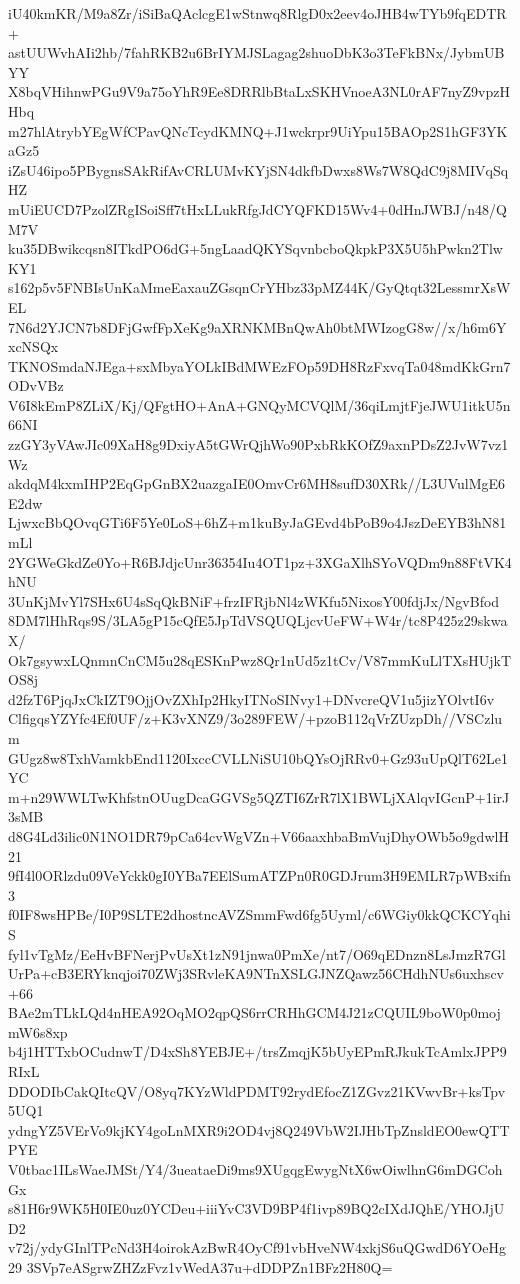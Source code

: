 iU40kmKR/M9a8Zr/iSiBaQAclcgE1wStnwq8RlgD0x2eev4oJHB4wTYb9fqEDTR+
astUUWvhAIi2hb/7fahRKB2u6BrIYMJSLagag2shuoDbK3o3TeFkBNx/JybmUBYY
X8bqVHihnwPGu9V9a75oYhR9Ee8DRRlbBtaLxSKHVnoeA3NL0rAF7nyZ9vpzHHbq
m27hlAtrybYEgWfCPavQNcTcydKMNQ+J1wckrpr9UiYpu15BAOp2S1hGF3YKaGz5
iZsU46ipo5PBygnsSAkRifAvCRLUMvKYjSN4dkfbDwxs8Ws7W8QdC9j8MIVqSqHZ
mUiEUCD7PzolZRgISoiSff7tHxLLukRfgJdCYQFKD15Wv4+0dHnJWBJ/n48/QM7V
ku35DBwikcqsn8ITkdPO6dG+5ngLaadQKYSqvnbcboQkpkP3X5U5hPwkn2TlwKY1
s162p5v5FNBIsUnKaMmeEaxauZGsqnCrYHbz33pMZ44K/GyQtqt32LessmrXsWEL
7N6d2YJCN7b8DFjGwfFpXeKg9aXRNKMBnQwAh0btMWIzogG8w//x/h6m6YxcNSQx
TKNOSmdaNJEga+sxMbyaYOLkIBdMWEzFOp59DH8RzFxvqTa048mdKkGrn7ODvVBz
V6I8kEmP8ZLiX/Kj/QFgtHO+AnA+GNQyMCVQlM/36qiLmjtFjeJWU1itkU5n66NI
zzGY3yVAwJIc09XaH8g9DxiyA5tGWrQjhWo90PxbRkKOfZ9axnPDsZ2JvW7vz1Wz
akdqM4kxmIHP2EqGpGnBX2uazgaIE0OmvCr6MH8sufD30XRk//L3UVulMgE6E2dw
LjwxcBbQOvqGTi6F5Ye0LoS+6hZ+m1kuByJaGEvd4bPoB9o4JszDeEYB3hN81mLl
2YGWeGkdZe0Yo+R6BJdjcUnr36354Iu4OT1pz+3XGaXlhSYoVQDm9n88FtVK4hNU
3UnKjMvYl7SHx6U4sSqQkBNiF+frzIFRjbNl4zWKfu5NixosY00fdjJx/NgvBfod
8DM7lHhRqs9S/3LA5gP15cQfE5JpTdVSQUQLjcvUeFW+W4r/tc8P425z29skwaX/
Ok7gsywxLQnmnCnCM5u28qESKnPwz8Qr1nUd5z1tCv/V87mmKuLlTXsHUjkTOS8j
d2fzT6PjqJxCkIZT9OjjOvZXhIp2HkyITNoSINvy1+DNvcreQV1u5jizYOlvtI6v
ClfigqsYZYfc4Ef0UF/z+K3vXNZ9/3o289FEW/+pzoB112qVrZUzpDh//VSCzlum
GUgz8w8TxhVamkbEnd1120IxccCVLLNiSU10bQYsOjRRv0+Gz93uUpQlT62Le1YC
m+n29WWLTwKhfstnOUugDcaGGVSg5QZTI6ZrR7lX1BWLjXAlqvIGcnP+1irJ3sMB
d8G4Ld3ilic0N1NO1DR79pCa64cvWgVZn+V66aaxhbaBmVujDhyOWb5o9gdwlH21
9fI4l0ORlzdu09VeYckk0gI0YBa7EElSumATZPn0R0GDJrum3H9EMLR7pWBxifn3
f0IF8wsHPBe/I0P9SLTE2dhostncAVZSmmFwd6fg5Uyml/c6WGiy0kkQCKCYqhiS
fyl1vTgMz/EeHvBFNerjPvUsXt1zN91jnwa0PmXe/nt7/O69qEDnzn8LsJmzR7Gl
UrPa+cB3ERYknqjoi70ZWj3SRvleKA9NTnXSLGJNZQawz56CHdhNUs6uxhscv+66
BAe2mTLkLQd4nHEA92OqMO2qpQS6rrCRHhGCM4J21zCQUIL9boW0p0mojmW6s8xp
b4j1HTTxbOCudnwT/D4xSh8YEBJE+/trsZmqjK5bUyEPmRJkukTcAmlxJPP9RIxL
DDODIbCakQItcQV/O8yq7KYzWldPDMT92rydEfocZ1ZGvz21KVwvBr+ksTpv5UQ1
ydngYZ5VErVo9kjKY4goLnMXR9i2OD4vj8Q249VbW2IJHbTpZnsldEO0ewQTTPYE
V0tbac1ILsWaeJMSt/Y4/3ueataeDi9ms9XUgqgEwygNtX6wOiwlhnG6mDGCohGx
s81H6r9WK5H0IE0uz0YCDeu+iiiYvC3VD9BP4f1ivp89BQ2cIXdJQhE/YHOJjUD2
v72j/ydyGInlTPcNd3H4oirokAzBwR4OyCf91vbHveNW4xkjS6uQGwdD6YOeHg29
3SVp7eASgrwZHZzFvz1vWedA37u+dDDPZn1BFz2H80Q=
